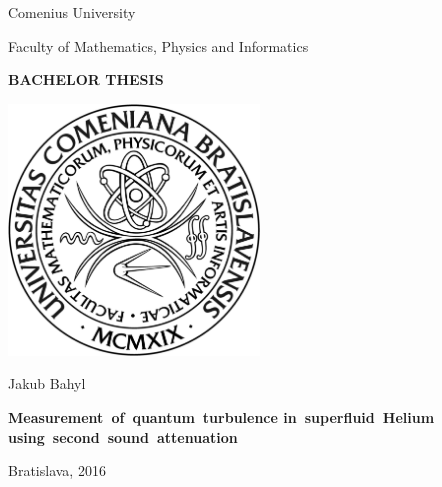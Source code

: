 \documentclass[a4paper, 12pt]{report}
\newcommand{\<}{\langle} %
\renewcommand{\>}{\rangle} %
\begin{document}
\pagestyle{empty}

\begin{center}
	\Large\sf
	Comenius University
	
	\Large
	Faculty of Mathematics, Physics and Informatics
	\bigskip
	
	{\Huge \bfseries \sffamily BACHELOR THESIS}
	\vspace*{1cm}
	
	
	
	\includegraphics[width=0.5\textwidth]{graphics/fmfi_logo.jpg} 
	
	\vspace{1.5cm}
	
	{\Huge\sf Jakub Bahyl}
	
	\vspace{15mm}
	
	{\Huge \bfseries \sffamily
		\mbox{Measurement of quantum turbulence}
		\mbox{in superfluid Helium}
		\mbox{using second sound attenuation}
	}
	
	\vfill
	

	
	
	
{\Large\sf Bratislava, 2016}

\end{center}



\newpage
\end{document}
